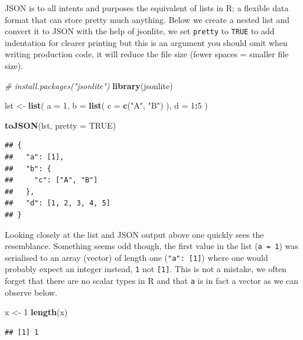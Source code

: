 \documentclass[
]{krantz}
\makeatletter
\newenvironment{Shaded}{\begin{snugshade}}{\end{snugshade}}
\newcommand{\CommentTok}[1]{\textcolor[rgb]{0.37,0.37,0.37}{\textit{#1}}}
\newcommand{\DataTypeTok}[1]{\textcolor[rgb]{0.27,0.27,0.27}{#1}}
\newcommand{\DecValTok}[1]{\textcolor[rgb]{0.06,0.06,0.06}{#1}}
\newcommand{\KeywordTok}[1]{\textcolor[rgb]{0.27,0.27,0.27}{\textbf{#1}}}
\newcommand{\NormalTok}[1]{#1}
\newcommand{\OperatorTok}[1]{\textcolor[rgb]{0.43,0.43,0.43}{\textbf{#1}}}
\newcommand{\OtherTok}[1]{\textcolor[rgb]{0.37,0.37,0.37}{#1}}
\newcommand{\StringTok}[1]{\textcolor[rgb]{0.5,0.5,0.5}{#1}}
\newenvironment{kframe}{%
\medskip{}
\setlength{\fboxsep}{.8em}
 \def\at@end@of@kframe{}%
 \ifinner\ifhmode%
  \def\at@end@of@kframe{\end{minipage}}%
  \begin{minipage}{\columnwidth}%
 \fi\fi%
 \def\FrameCommand##1{\hskip\@totalleftmargin \hskip-\fboxsep
 \colorbox{shadecolor}{##1}\hskip-\fboxsep
     \hskip-\linewidth \hskip-\@totalleftmargin \hskip\columnwidth}%
 \MakeFramed {\advance\hsize-\width
   \@totalleftmargin\z@ \linewidth\hsize
   \@setminipage}}%
 {\par\unskip\endMakeFramed%
 \at@end@of@kframe}
\renewenvironment{Shaded}{\begin{kframe}}{\end{kframe}}
\makeatother
\begin{document}
JSON is to all intents and purposes the equivalent of lists in R; a flexible data format that can store pretty much anything. Below we create a nested list and convert it to JSON with the help of jsonlite, we set \texttt{pretty} to \texttt{TRUE} to add indentation for clearer printing but this is an argument you should omit when writing production code, it will reduce the file size (fewer spaces = smaller file size).

\begin{Shaded}
\begin{Highlighting}[]
\CommentTok{\# install.packages("jsonlite")}
\KeywordTok{library}\NormalTok{(jsonlite)}

\NormalTok{lst <{-}}\StringTok{ }\KeywordTok{list}\NormalTok{(}
  \DataTypeTok{a =} \DecValTok{1}\NormalTok{,}
  \DataTypeTok{b =} \KeywordTok{list}\NormalTok{(}
    \DataTypeTok{c =} \KeywordTok{c}\NormalTok{(}\StringTok{"A"}\NormalTok{, }\StringTok{"B"}\NormalTok{)}
\NormalTok{  ),}
  \DataTypeTok{d =} \DecValTok{1}\OperatorTok{:}\DecValTok{5}
\NormalTok{)}

\KeywordTok{toJSON}\NormalTok{(lst, }\DataTypeTok{pretty =} \OtherTok{TRUE}\NormalTok{)}
\end{Highlighting}
\end{Shaded}

\begin{verbatim}
## {
##   "a": [1],
##   "b": {
##     "c": ["A", "B"]
##   },
##   "d": [1, 2, 3, 4, 5]
## }
\end{verbatim}

Looking closely at the list and JSON output above one quickly sees the resemblance. Something seems odd though, the first value in the list (\texttt{a\ =\ 1}) was serialised to an array (vector) of length one (\texttt{"a":\ {[}1{]}}) where one would probably expect an integer instead, \texttt{1} not \texttt{{[}1{]}}. This is not a mistake, we often forget that there are no scalar types in R and that \texttt{a} is in fact a vector as we can observe below.

\begin{Shaded}
\begin{Highlighting}[]
\NormalTok{x <{-}}\StringTok{ }\DecValTok{1}
\KeywordTok{length}\NormalTok{(x)}
\end{Highlighting}
\end{Shaded}

\begin{verbatim}
## [1] 1
\end{verbatim}
\end{document}
